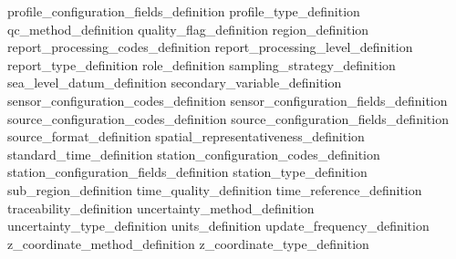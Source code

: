 \documentclass[a4paper,12pt]{article}
\begin{document}
 {profile_configuration_fields_definition}
 {profile_type_definition} %
 {qc_method_definition}
 {quality_flag_definition} %
 {region_definition} %
 {report_processing_codes_definition} %
 {report_processing_level_definition} %
 {report_type_definition} %
 {role_definition} %
 {sampling_strategy_definition} %
 {sea_level_datum_definition} %
 {secondary_variable_definition} %
 {sensor_configuration_codes_definition} %
 {sensor_configuration_fields_definition} %
 {source_configuration_codes_definition} %
 {source_configuration_fields_definition} %
 {source_format_definition} %
 {spatial_representativeness_definition} %
 {standard_time_definition} %
 {station_configuration_codes_definition} %
 {station_configuration_fields_definition} %
 {station_type_definition} %
 {sub_region_definition} %
 {time_quality_definition} %
 {time_reference_definition} %
 {traceability_definition} %
 {uncertainty_method_definition}
 {uncertainty_type_definition} %
 {units_definition} %
 {update_frequency_definition} %
 {z_coordinate_method_definition} %
 {z_coordinate_type_definition} %


\FloatBarrier
\newpage
\end{document}
